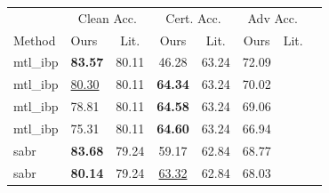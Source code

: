 \begin{tabular}{llcccccc}
\toprule
 & \multicolumn{2}{c}{Clean Acc.} & \multicolumn{2}{c}{Cert. Acc.} & \multicolumn{2}{c}{Adv Acc.} \\
Method & Ours & Lit. & Ours & Lit. & Ours & Lit. \\
\midrule
mtl\_ibp & \textbf{83.57} & 80.11 & 46.28 & 63.24 & 72.09 & \\
mtl\_ibp & \underline{80.30} & 80.11 & \textbf{64.34} & 63.24 & 70.02 & \\
mtl\_ibp & 78.81 & 80.11 & \textbf{64.58} & 63.24 & 69.06 & \\
mtl\_ibp & 75.31 & 80.11 & \textbf{64.60} & 63.24 & 66.94 & \\
sabr & \textbf{83.68} & 79.24 & 59.17 & 62.84 & 68.77 & \\
sabr & \textbf{80.14} & 79.24 & \underline{63.32} & 62.84 & 68.03 & \\
\bottomrule
\end{tabular}